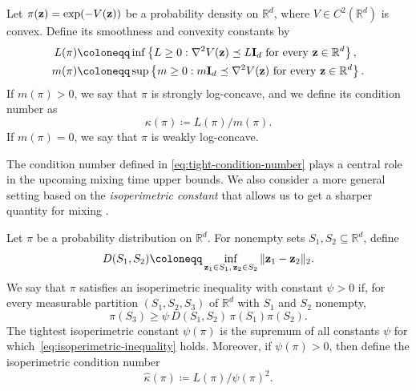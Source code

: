 \documentclass[onefignum,onetabnum]{siamonline250211}
\newcommand{\isocond}{\hat\kappa}
\newcommand{\bfI}{{\bf I}}
\newcommand{\bfz}{{\bf z}}
\newcommand{\bbR}{\mathbb{R}}
\begin{document}
\begin{definition}
  \label{def:tight-condition-number}
  Let $\pi(\bfz) = \exp(-V(\bfz))$ be a probability density on $\bbR^d$, where $V \in C^2(\bbR^d)$ is convex.
  Define its smoothness and convexity constants by
  \begin{align}
    L(\pi) & \coloneqq \inf\left\{ L \geq 0: \nabla^2 V(\bfz) \preceq L\bfI_d \text{ for every }\bfz \in \bbR^d \right\}, \label{eq:tight-smoothness-constant} \\
    m(\pi) & \coloneqq \sup\left\{ m \geq 0: m\bfI_d \preceq \nabla^2 V(\bfz) \text{ for every }\bfz \in \bbR^d \right\}. \label{eq:tight-strong-convexity-constant}
  \end{align}
  If $m(\pi) > 0$, we say that $\pi$ is strongly log-concave, and we define its condition number as
  \begin{equation}
    \label{eq:tight-condition-number}
    \kappa(\pi) \coloneqq L(\pi) / m(\pi).
  \end{equation}
If $m(\pi)=0$, we say that $\pi$ is weakly log-concave.
\end{definition}
The condition number defined in \eqref{eq:tight-condition-number} plays a central role in the upcoming mixing time upper bounds.
We also consider a more general setting based on the \emph{isoperimetric constant} that allows us to get a sharper quantity for mixing \cite{wu_minimax_2022,goodman_geometric_2005}.
\begin{definition}
  \label{def:isoperimetric-constant}
  Let $\pi$ be a probability distribution on $\bbR^d$.
  For nonempty sets $S_1,S_2 \subseteq \bbR^d$, define
  \begin{equation}
    D(S_1,S_2) \coloneqq \inf_{\bfz_1 \in S_1,\,\bfz_2 \in S_2} \|\bfz_1-\bfz_2\|_2.
  \end{equation}
  We say that $\pi$ satisfies an isoperimetric inequality with constant $\psi > 0$ if, for every measurable partition $(S_1,S_2,S_3)$ of $\bbR^d$ with $S_1$ and $S_2$ nonempty,
  \begin{equation}
    \label{eq:isoperimetric-inequality}
    \pi(S_3) \geq \psi\,D(S_1,S_2)\,\pi(S_1)\pi(S_2).
  \end{equation}
  The tightest isoperimetric constant $\psi(\pi)$ is the supremum of all constants $\psi$ for which~\eqref{eq:isoperimetric-inequality} holds.
  Moreover, if $\psi(\pi) > 0$, then define the isoperimetric condition number
  \begin{equation}
    \label{eq:isoperimetric-condition-number}
    \isocond(\pi) \coloneqq L(\pi) / \psi(\pi)^2.
  \end{equation}
\end{definition}
\end{document}
